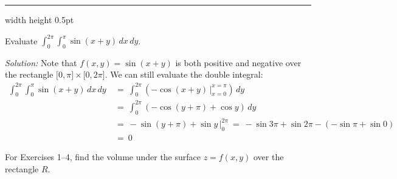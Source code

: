 \medskip
\hrule width \textwidth height 0.5pt
\begin{exmp}
Evaluate $\displaystyle\int_0^{2\pi} \displaystyle\int_0^{\pi} \sin (x+y) \,dx\,dy$.\smallskip
 \par\noindent \emph{Solution:} Note that $f(x,y) = \sin (x+y)$ is both positive and negative over the rectangle
 $\lbrack 0,\pi \rbrack \times \lbrack 0,2\pi \rbrack$. 
We can still evaluate the double integral:
 \begin{align*}
  \int_0^{2\pi} \int_0^{\pi} \sin (x+y) \,dx\,dy
   ~&=~ \int_0^{2\pi} \left( -\cos (x+y) \,\Big|_{x=0}^{x=\pi} \right) \,dy\\
   &=~ \int_0^{2\pi} (-\cos (y+\pi) + \cos y) \,dy\\
   &=~ -\sin (y+\pi) + \sin y \,\Big|_0^{2\pi} ~=~ -\sin 3\pi + \sin 2\pi - (-\sin \pi + \sin 0)\\
   &=~ 0
 \end{align*}
\end{exmp}
\startexercises\label{sec3dot1}
\par\noindent For Exercises 1--4, find the volume under the surface $z=f(x,y)$ over the rectangle $R$.

